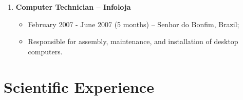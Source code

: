 \documentclass[10pt]{article}
\begin{document}
\begin{enumerate}
	\item \textbf{Computer Technician -- Infoloja}
	\begin{itemize}
		\item February 2007 - June 2007 (5 months) -- Senhor do Bonfim, Brazil;
		\item Responsible for assembly, maintenance, and installation of desktop computers.
	\end{itemize}

\end{enumerate}


\section*{Scientific Experience}
\end{document}
